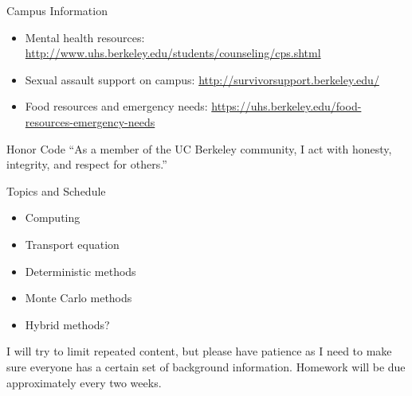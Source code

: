 \documentclass[xcolor=x11names]{beamer}
\begin{document}



\begin{frame}{Campus Information}

\begin{itemize}
  \item Mental health resources: \href{http://www.uhs.berkeley.edu/students/counseling/cps.shtml}{http://www.uhs.berkeley.edu/students/counseling/cps.shtml}
  \item Sexual assault support on campus: \href{http://survivorsupport.berkeley.edu/}{http://survivorsupport.berkeley.edu/}
  \item Food resources and emergency needs: \href{https://uhs.berkeley.edu/food-resources-emergency-needs}{https://uhs.berkeley.edu/food-resources-emergency-needs}
\end{itemize}

\end{frame}

\begin{frame}{Honor Code}
\center
``As a member of the UC Berkeley community, I act with honesty, integrity, and respect for others.''
\end{frame}

\begin{frame}{Topics and Schedule}
\begin{itemize}
\item Computing
\item Transport equation
\item Deterministic methods
\item Monte Carlo methods
\pause
\item Hybrid methods?
\end{itemize}
\vfill
\pause
I will try to limit repeated content, but please have patience as I need to make sure everyone has a certain set of background information.
\vfill
\pause
Homework will be due approximately every two weeks.
\end{frame}
\end{document}
